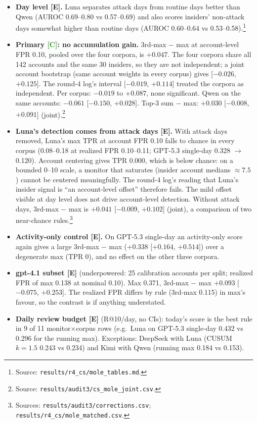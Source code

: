 \documentclass[11pt]{article}
\newcommand{\m}{\ensuremath{-}}
\newcommand{\src}[1]{\footnote{Source: \nolinkurl{#1}.}}
\newcommand{\srcs}[2]{\footnote{Sources: \nolinkurl{#1}; \nolinkurl{#2}.}}
\newcommand{\tC}{\textsf{\scriptsize\textcolor{ForestGreen}{[C]}}\xspace}
\newcommand{\tE}{\textsf{\scriptsize\textcolor{ink2}{[E]}}\xspace}
\begin{document}
\begin{itemize}
\item \textbf{Day level \tE.} Luna separates attack days from routine days better than Qwen (AUROC 0.69--0.80 vs 0.57--0.69) and also scores insiders' non-attack days somewhat higher than routine days (AUROC 0.60--0.64 vs 0.53--0.58).\src{results/r4_cs/mole_tables.md}
\item \textbf{Primary \tC: no accumulation gain.} 3rd-max $-$ max at account-level FPR 0.10, pooled over the four corpora, is $+0.047$. The four corpora share all 142 accounts and the same 30 insiders, so they are not independent; a joint account bootstrap (same account weights in every corpus) gives [$\m0.026$, $+0.125$]. The round-4 log's interval [$\m0.019$, $+0.114$] treated the corpora as independent. Per corpus: $\m0.019$ to $+0.087$, none significant. Qwen on the same accounts: $\m0.061$ [$\m0.150$, $+0.028$]. Top-3 sum $-$ max: $+0.030$ [$\m0.008$, $+0.091$] (joint).\src{results/audit3/cs_mole_joint.csv}
\item \textbf{Luna's detection comes from attack days \tE.} With attack days removed, Luna's max TPR at account FPR 0.10 falls to chance in every corpus (0.08--0.18 at realized FPR 0.10--0.11; GPT-5.3 single-day 0.328 $\to$ 0.120). Account centering gives TPR 0.000, which is below chance: on a bounded 0--10 scale, a monitor that saturates (insider account medians $\approx7.5$) cannot be centered meaningfully. The round-4 log's reading that Luna's insider signal is ``an account-level offset'' therefore fails. The mild offset visible at day level does not drive account-level detection. Without attack days, 3rd-max $-$ max is $+0.041$ [$\m0.009$, $+0.102$] (joint), a comparison of two near-chance rules.\srcs{results/audit3/corrections.csv}{results/r4_cs/mole_matched.csv}
\item \textbf{Activity-only control \tE.} On GPT-5.3 single-day an activity-only score again gives a large 3rd-max $-$ max ($+0.338$ [$+0.164$, $+0.514$]) over a degenerate max (TPR 0), and no effect on the other three corpora.
\item \textbf{gpt-4.1 subset \tE} (underpowered: 25 calibration accounts per split; realized FPR of max 0.138 at nominal 0.10). Max 0.371, 3rd-max $-$ max $+0.093$ [$\m0.075$, $+0.253$]. The realized FPR differs by rule (3rd-max 0.115) in max's favour, so the contrast is if anything understated.
\item \textbf{Daily review budget \tE} (R@10/day, no CIs): today's score is the best rule in 9 of 11 monitor$\times$corpus rows (e.g.\ Luna on GPT-5.3 single-day 0.432 vs 0.296 for the running max). Exceptions: DeepSeek with Luna (CUSUM $k{=}1.5$ 0.243 vs 0.234) and Kimi with Qwen (running max 0.184 vs 0.153).
\end{itemize}
\end{document}
